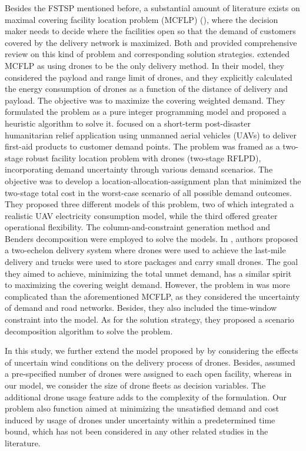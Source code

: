 \documentclass[preprint,review,11pt,authoryear]{elsarticle}
\begin{document}
Besides the FSTSP mentioned before, a substantial amount of literature exists on maximal covering facility location problem (MCFLP) (\cite{church1974maximal}), where the decision maker needs to decide where the facilities open so that the demand of customers covered by the delivery network is maximized. Both \cite{farahani2012covering} and \cite{owen1998strategic} provided comprehensive review on this kind of problem and corresponding solution strategies. \cite{chauhan2019maximum} extended MCFLP as using drones to be the only delivery method. In their model, they considered the payload and range limit of drones, and they explicitly calculated the energy consumption of drones as a function of the distance of delivery and payload. The objective was to maximize the covering weighted demand. They formulated the problem as a pure integer programming model and proposed a heuristic algorithm to solve it. \cite{zhu2022two} focused on a short-term post-disaster humanitarian relief application using unmanned aerial vehicles (UAVs) to deliver first-aid products to customer demand points. The problem was framed as a two-stage robust facility location problem with drones (two-stage RFLPD), incorporating demand uncertainty through various demand scenarios. The objective was to develop a location-allocation-assignment plan that minimized the two-stage total cost in the worst-case scenario of all possible demand outcomes. They proposed three different models of this problem, two of which integrated a realistic UAV electricity consumption model, while the third offered greater operational flexibility. The column-and-constraint generation method and Benders decomposition were employed to solve the models. In \cite{dukkanci2023drones}, authors proposed a two-echelon delivery system where drones were used to achieve the last-mile delivery and trucks were used to store packages and carry small drones. The goal they aimed to achieve, minimizing the total unmet demand, has a similar spirit to maximizing the covering weight demand. However, the problem in \cite{dukkanci2023drones} was more complicated than the aforementioned MCFLP, as they considered the uncertainty of demand and road networks. Besides, they also included the time-window constraint into the model. As for the solution strategy, they proposed a scenario decomposition algorithm to solve the problem. 

In this study, we further extend the model proposed by \cite{dukkanci2023drones} by considering the effects of uncertain wind conditions on the delivery process of drones. Besides, \cite{dukkanci2023drones} assumed a pre-specified number of drones were assigned to each open facility, whereas in our model, we consider the size of drone fleets as decision variables. The additional drone usage feature adds to the complexity of the formulation. Our problem also function aimed at minimizing the unsatisfied demand and cost induced by usage of drones under uncertainty within a predetermined time bound, which has not been considered in any other related studies in the literature.
\end{document}
